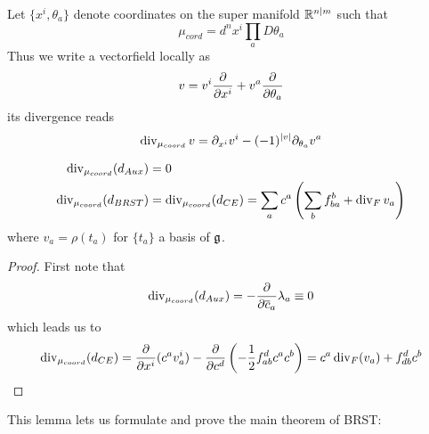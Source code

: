 \begin{rem}
  \begin{lem}
    Let $\{x^i, \theta_a\}$ denote coordinates on the super manifold $\mathbb{R}^{n|m}$ such that
    \begin{equation}
      \mu_{cord} = d^n x^i \prod_a D\theta_a
    \end{equation}
    Thus we write a vectorfield locally as
    \begin{equation}
      v = v^i \frac{\partial }{\partial x^i} + v^a \frac{\partial }{\partial \theta_a}
    \end{equation}
    its divergence reads
    \begin{equation}
      \operatorname{div}_{\mu_{coord}} v = \partial_{x^i} v^i - (-1)^{|v|} \partial_{\theta_a} v^a
    \end{equation}
  \end{lem}
\end{rem}

\begin{lem}
  \begin{align}
    \operatorname{div}_{\mu_{coord}} (d_{Aux}) &= 0 \\
    \operatorname{div}_{\mu_{coord}} (d_{BRST}) &= \operatorname{div}_{\mu_{coord}} (d_{CE}) = \sum_a c^a \left( \sum_b f^b_{ba} + \operatorname{div}_F v_a \right)
  \end{align}
  where $v_a = \rho(t_a)$ for $\{t_a\}$ a basis of $\mathfrak{g}$.
\begin{proof}
  First note that
  $$ \operatorname{div}_{\mu_{coord}} (d_{Aux}) = - \frac{\partial }{\partial \overline{c}_a} \lambda_a \equiv 0 $$
  which leads us to
  $$ \operatorname{div}_{\mu_{coord}} (d_{CE}) = \frac{\partial }{\partial x^i} (c^a v_a^i) - \frac{\partial }{\partial c^d} \left(- \frac{1}{2} f^d_{ab}c^a c^b\right) = c^a \operatorname{div}_F (v_a) + f^d_{db}c^b $$
\end{proof}
\end{lem}

This lemma lets us formulate and prove the main theorem of BRST:

